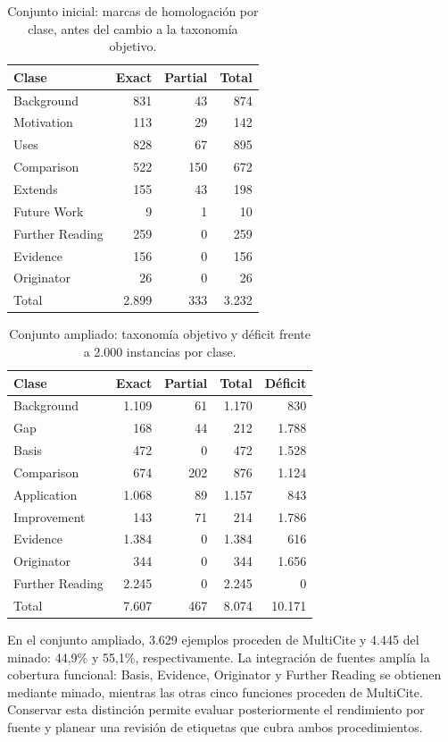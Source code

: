 \documentclass[10pt,a4paper,twocolumn]{article}
\begin{document}
\begin{table}[t]
\centering\small
\caption{Conjunto inicial: marcas de homologación por clase, antes del cambio a la taxonomía objetivo.}\label{tab:3k}
\begin{tabular}{lrrr}\toprule
Clase & Exact & Partial & Total\\\midrule
Background & 831 & 43 & 874\\
Motivation & 113 & 29 & 142\\
Uses & 828 & 67 & 895\\
Comparison & 522 & 150 & 672\\
Extends & 155 & 43 & 198\\
Future Work & 9 & 1 & 10\\
Further Reading & 259 & 0 & 259\\
Evidence & 156 & 0 & 156\\
Originator & 26 & 0 & 26\\\midrule
Total & 2.899 & 333 & 3.232\\\bottomrule
\end{tabular}
\end{table}

\begin{table}[t]
\centering\small
\caption{Conjunto ampliado: taxonomía objetivo y déficit frente a 2.000 instancias por clase.}\label{tab:8k}
\setlength{\tabcolsep}{3pt}
\begin{tabular}{lrrrr}\toprule
Clase & Exact & Partial & Total & Déficit\\\midrule
Background & 1.109 & 61 & 1.170 & 830\\
Gap & 168 & 44 & 212 & 1.788\\
Basis & 472 & 0 & 472 & 1.528\\
Comparison & 674 & 202 & 876 & 1.124\\
Application & 1.068 & 89 & 1.157 & 843\\
Improvement & 143 & 71 & 214 & 1.786\\
Evidence & 1.384 & 0 & 1.384 & 616\\
Originator & 344 & 0 & 344 & 1.656\\
Further Reading & 2.245 & 0 & 2.245 & 0\\\midrule
Total & 7.607 & 467 & 8.074 & 10.171\\\bottomrule
\end{tabular}
\end{table}

En el conjunto ampliado, 3.629 ejemplos proceden de MultiCite y 4.445 del minado: 44,9\% y 55,1\%, respectivamente. La integración de fuentes amplía la cobertura funcional: Basis, Evidence, Originator y Further Reading se obtienen mediante minado, mientras las otras cinco funciones proceden de MultiCite. Conservar esta distinción permite evaluar posteriormente el rendimiento por fuente y planear una revisión de etiquetas que cubra ambos procedimientos.
\end{document}
